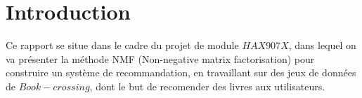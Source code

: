 \documentclass[11pt,letterpaper,twocolumn]{article}
\begin{document}
\section{Introduction}
\par \vspace{1mm}
\justify
 
Ce rapport se situe dans le cadre du projet de module $HAX907X$, dans lequel on va présenter la méthode NMF (Non-negative matrix factorisation) pour construire un système de recommandation, en travaillant sur des jeux de données de \href{https://www.bookcrossing.com/}{$Book-crossing$}, dont le but de recomender des livres aux utilisateurs.

\par \vspace{1mm}  %

\end{document}
